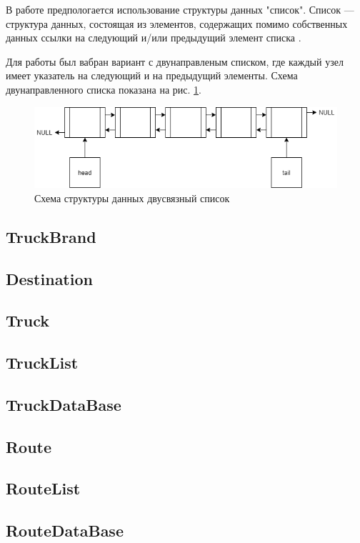 В работе предпологается использование структуры данных "список".
Список --- структура данных, состоящая из элементов, 
содержащих помимо собственных данных ссылки на 
следующий и/или предыдущий элемент списка \cite{list_defenition}.

Для работы был вабран вариант с двунаправленым списком, 
где каждый узел имеет указатель на следующий и на предыдущий элементы.
Схема двунаправленного списка показана на рис. \ref{list_schema}.

\begin{figure}[hpt!]
    \centering
    \includegraphics[width=1\linewidth]{photo/list_schema}
    \caption{Схема структуры данных двусвязный список}
    \label{list_schema}
\end{figure}

\subsection{TruckBrand}
\subsection{Destination}
\subsection{Truck}
\subsection{TruckList}
\subsection{TruckDataBase}
\subsection{Route}
\subsection{RouteList}
\subsection{RouteDataBase}
